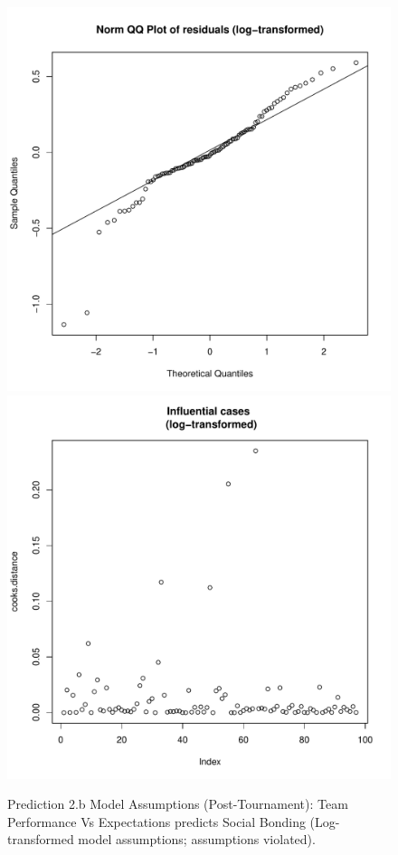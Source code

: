 \begin{CJK}{UTF8}{gbsn}
\begin{figure}[!htbp]
        \includegraphics[scale =.4]{images/MLM23bLogQQNorm.pdf}
        \includegraphics[scale =.4]{images/MLM23bLogCooksD.pdf}
        \caption{Prediction 2.b Model Assumptions (Post-Tournament): Team Performance Vs Expectations predicts Social Bonding (Log-transformed model assumptions; assumptions violated).}
        \label{fig:MLM3bLogAssumptions}
      \end{figure}



\end{CJK}
